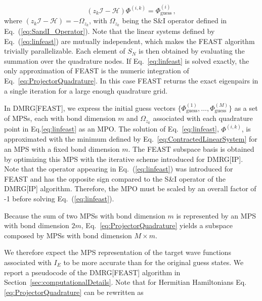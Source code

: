 \documentclass[journal=jctcce]{achemso}
\newcommand{\opr}[1]{\mathcal{#1}}
\begin{document}
\begin{equation}
  (z_k \opr{I}- \opr{H}) \Phi^{(i,k)} = \Phi^{(i)}_{\text{guess}} \, ,
  \label{eq:linfeast}
\end{equation}
%
where $(z_k \opr{I}- \opr{H}) = -\Omega_{z_k}$, with $\Omega_{z_k}$ being the S\&I operator defined in Eq.~(\ref{eq:SandI_Operator}).
Note that the linear systems defined by Eq.~(\ref{eq:linfeast}) are mutually independent, which makes the FEAST algorithm trivially parallelizable.
Each element of $S_N$ is then obtained by evaluating the summation over the quadrature nodes. If Eq.~\eqref{eq:linfeast} is solved exactly, the only approximation of FEAST is the numeric integration of Eq.~\eqref{eq:ProjectorQuadrature}. 
In this case FEAST returns the exact eigenpairs in a single iteration for a large enough quadrature grid.

\noindent In DMRG[FEAST], we express the initial guess vectors $\{\Phi^{(1)}_{\text{guess}}, \ldots, \Phi^{(M)}_{\text{guess}}\}$ as a set of MPSs, each with bond dimension $m$ and $\Omega_{z_k}$ associated with each quadrature point in Eq.\eqref{eq:linfeast} as an MPO.
The solution of Eq.~\eqref{eq:linfeast}, $\Phi^{(i,k)}$, is approximated with the minimum defined by Eq.~\eqref{eq:ContractedLinearSystem} for an MPS with a fixed bond dimension $m$.
The FEAST subspace basis is obtained by optimizing this MPS with the iterative scheme 
introduced for DMRG[IP]. Note that the operator appearing in Eq.~(\ref{eq:linfeast}) 
was introduced for FEAST and has the opposite sign compared to the S\&I operator of the DMRG[IP] 
algorithm. Therefore, the MPO must be scaled by an overall factor of 
-1 before solving Eq.~(\ref{eq:linfeast}).

Because the sum of two MPSs with bond dimension $m$ is represented by an MPS with bond dimension $2m$,\cite{Oseledts2016,Guo2018_DMRG-Hylleraas} Eq.~\eqref{eq:ProjectorQuadrature} yields a subspace composed by MPSs with bond dimension $M \times m$.

We therefore expect the MPS representation of the target wave functions associated with $I_E$ to be more accurate than for the original guess states.
We report a pseudocode of the DMRG[FEAST] algorithm in Section~\ref{sec:computationalDetails}.
Note that for Hermitian Hamiltonians Eq.\eqref{eq:ProjectorQuadrature} can be rewritten as\cite{Polizzi2009_FEAST}
\end{document}
